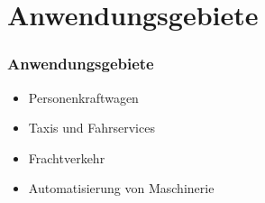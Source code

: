 \section{Anwendungsgebiete}

\begin{frame}
    \frametitle{Anwendungsgebiete}
    
    \begin{itemize}
        \item Personenkraftwagen
        \item Taxis und Fahrservices
        \item Frachtverkehr
        \item Automatisierung von Maschinerie
    \end{itemize}
\end{frame}
